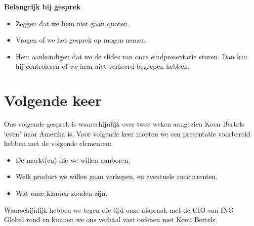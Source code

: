 \documentclass[12pt, a4paper]{article}
\newenvironment{important}[1][]{%
   \begin{mdframed}[%
      backgroundcolor={red!15}, hidealllines=true,
      skipabove=0.7\baselineskip, skipbelow=0.7\baselineskip,
      splitbottomskip=2pt, splittopskip=4pt, #1]%
   \makebox[0pt]{%
      \smash{%
         \fontsize{32pt}{32pt}\selectfont%
         \hspace*{-19pt}%
         \raisebox{-2pt}{%
            {\color{red!70!black}\sffamily\bfseries !}%
         }%
      }%
   }%
}{\end{mdframed}}
\newcommand{\excll}[2]{
\begin{important}
  \textbf{#1}\\#2
\end{important}
}
\begin{document}
\excll{Belangrijk bij gesprek}{\begin{itemize}
  \item Zeggen dat we hem niet gaan quoten.
  \item Vragen of we het gesprek op mogen nemen.
  \item Hem aankondigen dat we de slides van onze eindpresentatie sturen. Dan kan hij controleren of we hem niet verkeerd begrepen hebben.
  \end{itemize}
}

\section{Volgende keer}
Ons volgende gesprek is waarschijnlijk over twee weken aangezien Koen Bertels `even' naar Amerika is. Voor volgende keer moeten we een presentatie voorbereid hebben met de volgende elementen:
\begin{itemize}
\item De markt(en) die we willen aanboren.
\item Welk product we willen gaan verkopen, en eventuele concurrenten.
\item Wat onze klanten zouden zijn.
\end{itemize}
Waarschijnlijk hebben we tegen die tijd onze afspraak met de CIO van ING Global rond en kunnen we ons verhaal vast oefenen met Koen Bertels.
\end{document}
